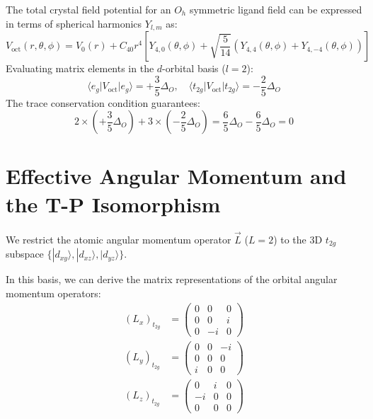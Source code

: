 \documentclass[11pt,a4paper]{article}
\begin{document}
\begin{proofstep}
    The total crystal field potential for an $O_h$ symmetric ligand field can be expressed in terms of spherical harmonics $Y_{l,m}$ as:
    \begin{equation}
        V_{\text{oct}}(r, \theta, \phi) = V_0(r) + C_{40} r^4 \left[ Y_{4,0}(\theta, \phi) + \sqrt{\frac{5}{14}} \left( Y_{4,4}(\theta, \phi) + Y_{4,-4}(\theta, \phi) \right) \right]
    \end{equation}
    Evaluating matrix elements in the $d$-orbital basis ($l=2$):
    \begin{equation}
        \langle e_g | V_{\text{oct}} | e_g \rangle = +\frac{3}{5}\Delta_O, \quad \langle t_{2g} | V_{\text{oct}} | t_{2g} \rangle = -\frac{2}{5}\Delta_O
    \end{equation}
    The trace conservation condition guarantees:
    \begin{equation}
        2 \times \left( +\frac{3}{5}\Delta_O \right) + 3 \times \left( -\frac{2}{5}\Delta_O \right) = \frac{6}{5}\Delta_O - \frac{6}{5}\Delta_O = 0
    \end{equation}
\end{proofstep}

\section{Effective Angular Momentum and the T-P Isomorphism}

We restrict the atomic angular momentum operator $\vec{L}$ ($L=2$) to the 3D $t_{2g}$ subspace $\{|d_{xy}\rangle, |d_{xz}\rangle, |d_{yz}\rangle\}$.

In this basis, we can derive the matrix representations of the orbital angular momentum operators:
\begin{align}
    (L_x)_{t_{2g}} &= \begin{pmatrix} 0 & 0 & 0 \\ 0 & 0 & i \\ 0 & -i & 0 \end{pmatrix} \\
    (L_y)_{t_{2g}} &= \begin{pmatrix} 0 & 0 & -i \\ 0 & 0 & 0 \\ i & 0 & 0 \end{pmatrix} \\
    (L_z)_{t_{2g}} &= \begin{pmatrix} 0 & i & 0 \\ -i & 0 & 0 \\ 0 & 0 & 0 \end{pmatrix}
\end{align}
\end{document}
